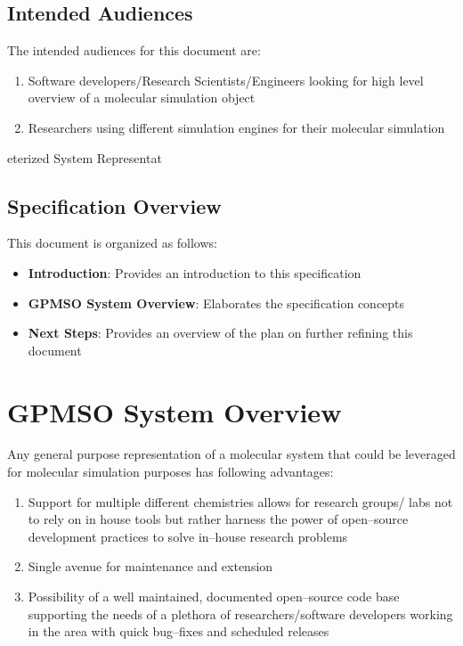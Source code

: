\documentclass[12pt]{article}
\begin{document}
\subsection{Intended Audiences}
The intended audiences for this document are:

\begin{enumerate}
    \item Software developers/Research Scientists/Engineers looking for high level overview of a molecular simulation object
    \item Researchers using different simulation engines for their molecular simulation
\end{enumerate}
eterized System Representat
\subsection{Specification Overview}
This document is organized as follows:
\begin{itemize}
    \item \textbf{Introduction}: Provides an introduction to this specification
    \item \textbf{GPMSO System Overview}: Elaborates the specification concepts
    \item \textbf{Next Steps}: Provides an overview of the plan on further refining this document
\end{itemize}

\pagebreak
\section{GPMSO System Overview}
Any general purpose representation of a molecular system that could be leveraged for molecular simulation purposes has following advantages:
\begin{enumerate}
    \item Support for multiple different chemistries allows for research groups/ labs not to rely on in house tools but rather harness the power of open--source development practices to solve in--house research problems
    \item Single avenue for maintenance and extension
    \item Possibility of a well maintained, documented open--source code base supporting the needs of a plethora of researchers/software developers working in the area with quick bug--fixes and scheduled releases
\end{enumerate}
\end{document}
